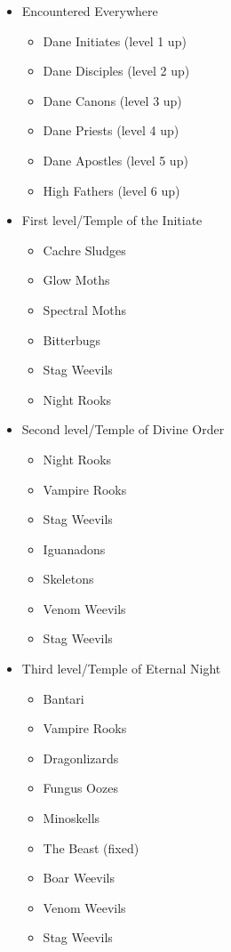 \documentclass[12pt]{article}
\providecommand{\tightlist}{%
  \setlength{\itemsep}{0pt}\setlength{\parskip}{0pt}}
\begin{document}
\begin{multicols}{2}\RaggedRight{}
  \begin{itemize}
  \item Encountered Everywhere

    \begin{itemize}
      \tightlist
    \item Dane Initiates (level 1 up)
    \item Dane Disciples (level 2 up)
    \item Dane Canons (level 3 up)
    \item Dane Priests (level 4 up)
    \item Dane Apostles (level 5 up)
    \item High Fathers (level 6 up)
    \end{itemize}

  \item First level/Temple of the Initiate
    \begin{itemize}
      \tightlist
    \item Cachre Sludges
    \item Glow Moths
    \item Spectral Moths
    \item Bitterbugs
    \item Stag Weevils
    \item Night Rooks
    \end{itemize}

  \item Second level/Temple of Divine Order
    \begin{itemize}
      \tightlist
    \item Night Rooks
    \item Vampire Rooks
    \item Stag Weevils
    \item Iguanadons
    \item Skeletons
    \item Venom Weevils
    \item Stag Weevils
    \end{itemize}

    \item Third level/Temple of Eternal Night
      \begin{itemize}
        \tightlist
      \item Bantari
      \item Vampire Rooks
      \item Dragonlizards
      \item Fungus Oozes
      \item Minoskells
      \item The Beast (fixed)
      \item Boar Weevils
      \item Venom Weevils
      \item Stag Weevils
      \end{itemize}


\end{itemize}
\end{multicols}
\end{document}
